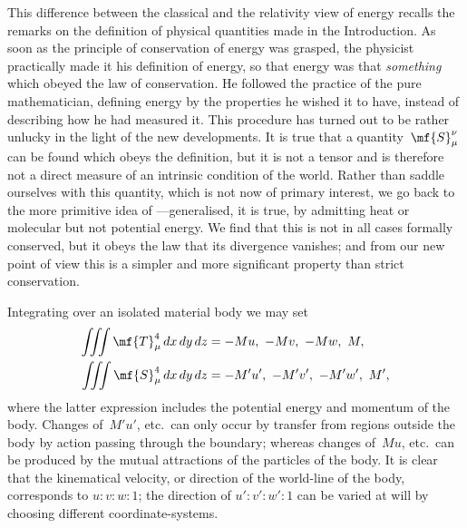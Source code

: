 \documentclass[12pt]{book}
\begin{document}
This difference between the classical and the relativity view of energy
recalls the remarks on the definition of physical quantities made in the Introduction.
As soon as the principle of conservation of energy was grasped, the
physicist practically made it his definition of energy, so that energy was that
\emph{something} which obeyed the law of conservation. He followed the practice of
the pure mathematician, defining energy by the properties he wished it to
have, instead of describing how he had measured it. This procedure has turned
out to be rather unlucky in the light of the new developments. It is true that
a quantity~$\mf{S}_{\mu}^{\nu}$ can be found which obeys the definition, but it is not a tensor
and is therefore not a direct measure of an intrinsic condition of the world.
Rather than saddle ourselves with this quantity, which is not now of primary
interest, we go back to the more primitive idea of ---generalised, it is
true, by admitting heat or molecular  but not potential energy. We
find that this is not in all cases formally conserved, but it obeys the law that
its divergence vanishes; and from our new point of view this is a simpler and
more significant property than strict conservation.

Integrating over an isolated material body we may set
\begin{align*}
\iiint \mf{T}_{\mu}^{4}\, dx\, dy\, dz &= -Mu,\ -Mv,\ -Mw,\ M, \\
\iiint \mf{S}_{\mu}^{4}\, dx\, dy\, dz &= -M'u',\ -M'v',\ -M'w',\ M',
\end{align*}
where the latter expression includes the potential energy and momentum of
the body. Changes of~$M'u'$, etc.\ can only occur by transfer from regions outside
the body by action passing through the boundary; whereas changes of~$Mu$,
%
etc.\ can be produced by the mutual attractions of the particles of the
body. It is clear that the kinematical velocity, or direction of the world-line
of the body, corresponds to $u : v : w : 1$; the direction of $u' : v': w' : 1$ can be varied
at will by choosing different coordinate-systems.

\end{document}
